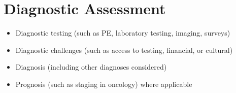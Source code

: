 \section{Diagnostic Assessment}

\begin{itemize}
    \item Diagnostic testing (such as PE, laboratory testing, imaging, surveys)

    \item Diagnostic challenges (such as access to testing, financial, or cultural)

    \item Diagnosis (including other diagnoses considered)

    \item Prognosis (such as staging in oncology) where applicable

\end{itemize}







